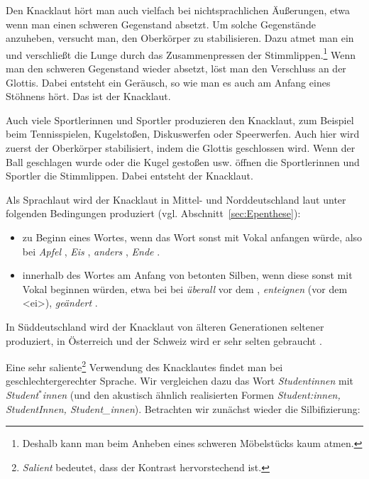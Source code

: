 Den Knacklaut hört man auch vielfach bei nichtsprachlichen Äußerungen, etwa wenn man einen schweren Gegenstand absetzt. Um solche Gegenstände anzuheben, versucht man, den Oberkörper zu stabilisieren. Dazu atmet man ein und verschließt die Lunge durch das Zusammenpressen der Stimmlippen.\footnote{Deshalb kann man beim Anheben eines schweren Möbelstücks kaum atmen.} Wenn man den schweren Gegenstand wieder absetzt, löst man den Verschluss an der Glottis. Dabei entsteht ein Geräusch, so wie man es auch am Anfang eines Stöhnens hört. Das ist der Knacklaut.

Auch viele Sportlerinnen und Sportler produzieren den Knacklaut, zum Beispiel beim Tennisspielen, Kugelstoßen, Diskuswerfen oder Speerwerfen. Auch hier wird zuerst der Oberkörper stabilisiert, indem die Glottis geschlossen wird. Wenn der Ball geschlagen wurde oder die Kugel gestoßen usw. öffnen die Sportlerinnen und Sportler die Stimmlippen. Dabei entsteht der Knacklaut.

Als Sprachlaut wird der Knacklaut in Mittel- und Norddeutschland laut \citet[14, 65f]{DudenAussprache2023} unter folgenden Bedingungen produziert (vgl. Abschnitt~\ref{sec:Epenthese}): 
\begin{itemize}
    \item zu Beginn eines Wortes, wenn das Wort sonst mit Vokal anfangen würde, also \zB bei \textit{Apfel} \textipa{[\textprimstress Pa\.*{\t{pf}}@l]}, \textit{Eis} \textipa{[P\t*{aI}s]}, \textit{anders} , \textit{Ende} .
    \item  innerhalb des Wortes am Anfang von betonten Silben, wenn diese sonst mit Vokal beginnen würden, etwa bei bei \textit{überall}  vor dem \textipa{[a]}, \textit{enteignen}  (vor dem <ei>), \textit{geändert} .
\end{itemize}

In Süddeutschland wird der Knacklaut von älteren Generationen seltener produziert, in Österreich und der Schweiz wird er sehr selten gebraucht \citep[66]{DudenAussprache2023}.

Eine sehr saliente\footnote{\textit{Salient} bedeutet, dass der Kontrast hervorstechend ist.} Verwendung des Knacklautes findet man bei  geschlechtergerechter Sprache. Wir vergleichen dazu das Wort \textit{Studentinnen} mit \textit{Student$^\ast$innen} (und den akustisch ähnlich realisierten Formen \textit{Student:innen, StudentInnen, Student\_innen}). Betrachten wir zunächst wieder die Silbifizierung:

